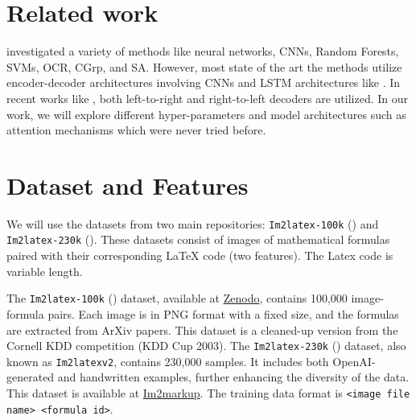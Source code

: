 \documentclass{article}
\begin{document}
\section{Related work}
\cite{schechter2017converting} investigated a variety of methods like neural networks, CNNs, Random Forests, SVMs, OCR, CGrp, and SA. However, most state of the art the methods utilize encoder-decoder architectures involving CNNs and LSTM architectures like \cite{genthial2016image}. In recent works like \cite{bian2022handwritten}, both left-to-right and right-to-left decoders are utilized. In our work, we will explore different hyper-parameters and model architectures such as attention mechanisms which were never tried before. 

\section{Dataset and Features}

We will use the datasets from two main repositories: \texttt{Im2latex-100k} (\cite{kanervisto_2016_56198}) and \texttt{Im2latex-230k} (\cite{gervais2024mathwritingdatasethandwrittenmathematical}). These datasets consist of images of mathematical formulas paired with their corresponding LaTeX code (two features). The Latex code is variable length.

The \texttt{Im2latex-100k} (\cite{kanervisto_2016_56198}) dataset, available at \href{https://zenodo.org/records/11230382}{Zenodo}, contains 100,000 image-formula pairs. Each image is in PNG format with a fixed size, and the formulas are extracted from ArXiv papers. This dataset is a cleaned-up version from the Cornell KDD competition (KDD Cup 2003). The \texttt{Im2latex-230k} (\cite{gervais2024mathwritingdatasethandwrittenmathematical}) 
 dataset, also known as \texttt{Im2latexv2}, contains 230,000 samples. It includes both OpenAI-generated and handwritten examples, further enhancing the diversity of the data. This dataset is available at \href{https://im2markup.yuntiandeng.com/data/}{Im2markup}. The training data format is \texttt{<image file name> <formula id>}.
 
\end{document}
